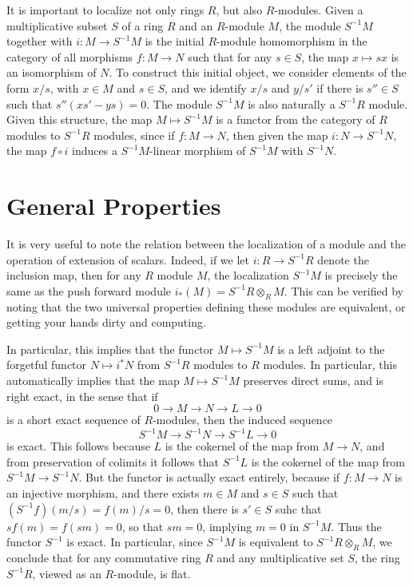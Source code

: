 It is important to localize not only rings $R$, but also $R$-modules. Given a multiplicative subset $S$ of a ring $R$ and an $R$-module $M$, the module $S^{-1}M$ together with $i: M \to S^{-1}M$ is the initial $R$-module homomorphism in the category of all morphisms $f: M \to N$ such that for any $s \in S$, the map $x \mapsto sx$ is an isomorphism of $N$. To construct this initial object, we consider elements of the form $x/s$, with $x \in M$ and $s \in S$, and we identify $x/s$ and $y/s'$ if there is $s'' \in S$ such that $s''(xs' - ys) = 0$. The module $S^{-1}M$ is also naturally a $S^{-1}R$ module. Given this structure, the map $M \mapsto S^{-1}M$ is a functor from the category of $R$ modules to $S^{-1}R$ modules, since if $f: M \to N$, then given the map $i: N \to S^{-1}N$, the map $f \circ i$ induces a $S^{-1}M$-linear morphism of $S^{-1}M$ with $S^{-1}N$.

\section{General Properties}

It is very useful to note the relation between the localization of a module and the operation of extension of scalars. Indeed, if we let $i: R \to S^{-1}R$ denote the inclusion map, then for any $R$ module $M$, the localization $S^{-1}M$ is precisely the same as the push forward module $i_*(M) = S^{-1}R \otimes_R M$. This can be verified by noting that the two universal properties defining these modules are equivalent, or getting your hands dirty and computing.

In particular, this implies that the functor $M \mapsto S^{-1}M$ is a left adjoint to the forgetful functor $N \mapsto i^* N$ from $S^{-1}R$ modules to $R$ modules. In particular, this automatically implies that the map $M \mapsto S^{-1}M$ preserves direct sums, and is right exact, in the sense that if
%
\[ 0 \to M \to N \to L \to 0 \]
%
is a short exact sequence of $R$-modules, then the induced sequence
%
\[ S^{-1}M \to S^{-1}N \to S^{-1}L \to 0 \]
%
is exact. This follows because $L$ is the cokernel of the map from $M \to N$, and from preservation of colimits it follows that $S^{-1}L$ is the cokernel of the map from $S^{-1}M \to S^{-1}N$. But the functor is actually exact entirely, because if $f: M \to N$ is an injective morphism, and there exists $m \in M$ and $s \in S$ such that $(S^{-1}f)(m/s) = f(m)/s = 0$, then there is $s' \in S$ suhc that $s f(m) = f(sm) = 0$, so that $sm = 0$, implying $m = 0$ in $S^{-1}M$. Thus the functor $S^{-1}$ is exact. In particular, since $S^{-1}M$ is equivalent to $S^{-1}R \otimes_R M$, we conclude that for any commutative ring $R$ and any multiplicative set $S$, the ring $S^{-1}R$, viewed as an $R$-module, is flat.

